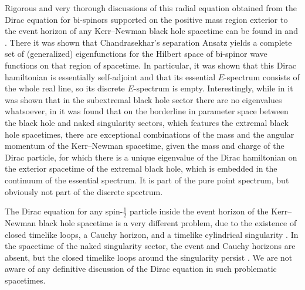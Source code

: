 \documentclass[11 pt]{article}
\renewcommand\({\left(}
\renewcommand\){\right)}
\newcommand\<{\langle}
\renewcommand\>{\rangle}
\newcommand\8{\infty}
\begin{document}
   Rigorous and very thorough discussions of this radial equation obtained from the Dirac equation for bi-spinors supported on the positive mass region 
exterior to the event horizon of any Kerr--Newman black hole spacetime can be found in \cite{FKSYinATMP2003} and \cite{BSa}.
  There it was shown that Chandrasekhar's separation Ansatz yields a complete set of (generalized) eigenfunctions for the Hilbert space of bi-spinor wave functions
on that region of spacetime. 
   In particular, it was shown that this Dirac hamiltonian is essentially self-adjoint and that its essential $E$-spectrum consists of the whole real line, so its 
discrete $E$-spectrum is empty. 
   Interestingly, while in \cite{BSa} it was shown that in the subextremal black hole sector there are no eigenvalues whatsoever, in \cite{Schmid} it was 
found that on the borderline in parameter space between the black hole and naked singularity sectors, which features the extremal black hole
spacetimes, there are exceptional combinations of the mass and the angular momentum of the Kerr--Newman spacetime, given the 
mass and charge of the Dirac particle, for which there is a unique eigenvalue of the Dirac hamiltonian on the exterior spacetime of the extremal black hole, 
which is embedded in the continuum of the essential spectrum. 
It is part of the pure point spectrum, but obviously not part of the discrete spectrum.

   The Dirac equation for any spin-$\frac12$ particle inside the event horizon of the Kerr--Newman black hole spacetime is a very different problem, due to the 
 existence of closed timelike loops, a Cauchy horizon, and a timelike cylindrical singularity \cite{Car68}.
   In the spacetime of the naked singularity sector, 
 the event and Cauchy horizons are absent, but the closed timelike loops around the singularity persist \cite{Car68}.
   We are not aware of any definitive discussion of the Dirac equation in such problematic spacetimes. 
 
\end{document}
